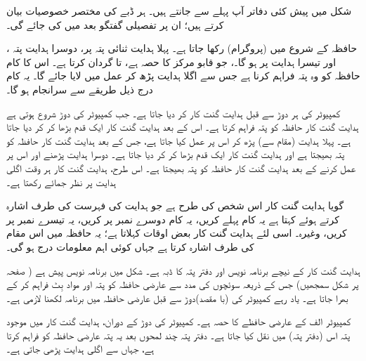 شکل  میں پیش کئی دفاتر  آپ پہلے سے  جانتے ہیں۔  ہر ڈبے کی مختصر  خصوصیات بیان کرتے ہیں؛ ان پر تفصیلی گفتگو بعد میں کی جائے گی۔

حافظہ  کے شروع میں (پروگرام)  رکھا جاتا ہے۔ پہلا ہدایت ثنائی پتہ  پر، دوسرا ہدایت پتہ ، اور تیسرا ہدایت  پر ہو گا۔،  جو قابو مرکز کا حصہ ہے،  تا  گردان کرتا ہے۔ اس کا کام حافظہ کو وہ پتہ فراہم کرنا ہے جس سے اگلا ہدایت پڑھ کر عمل میں لایا جائے گا۔ یہ کام درج ذیل طریقے سے سرانجام ہو گا۔

کمپیوٹر کی ہر دوڑ  سے قبل ہدایت گنت کار     کر دیا جاتا ہے۔ جب کمپیوٹر کی دوڑ شروع  ہوتی ہے ہدایت گنت کار   حافظہ کو پتہ  فراہم کرتا ہے۔ اس کے بعد ہدایت گنت کار   ایک قدم بڑھا کر   کر دیا جاتا ہے۔ پہلا ہدایت (مقام  سے) پڑھ کر اس پر عمل کیا جاتا ہے، جس کے بعد ہدایت گنت کار حافظہ کو پتہ  بھیجتا ہے اور   ہدایت گنت کار ایک قدم بڑھا کر  کر دیا جاتا ہے۔ دوسرا ہدایت پڑھنے اور اس پر عمل کرنے کے بعد ہدایت گنت کار حافظہ کو  پتہ بھیجتا ہے۔ اس طرح، ہدایت گنت کار ہر وقت اگلی  ہدایت  پر نظر جمائے رکھتا ہے۔

گویا ہدایت گنت کار اس شخص کی طرح ہے جو ہدایت کی فہرست  کی طرف اشارہ کرتے ہوئے کہتا ہے یہ کام  پہلے کریں، یہ کام دوسرے نمبر پر کریں، یہ تیسرے نمبر پر کریں، وغیرہ۔ اسی لئے ہدایت گنت کار بعض اوقات  کہلاتا ہے؛ یہ حافظہ میں اس مقام کی طرف اشارہ کرتا ہے جہاں کوئی   اہم معلومات درج ہو گی۔

ہدایت گنت کار کے نیچے برنامہ نویس   اور دفتر پتہ کا  ڈبہ ہے۔ شکل  میں برنامہ نویس پیش ہے (     صفحہ  پر شکل  سمجھیں)   جس  کے ذریعہ سوئچوں  کی مدد سے   عارضی حافظہ کو   پتہ اور  مواد   بِٹ فراہم کر  کے بھرا جاتا ہے۔ یاد رہے کمپیوٹر کی  (با مقصد)دوڑ سے قبل عارضی حافظہ میں برنامہ  لکھنا لازمی ہے۔

   کمپیوٹر  الف کے عارضی حافظے کا حصہ ہے۔ کمپیوٹر  کی دوڑ کے دوران، ہدایت گنت کار  میں موجود پتہ  اس   (دفتر پتہ)     میں  نقل  کیا جاتا ہے۔  دفتر پتہ   چند لمحوں بعد یہ پتہ عارضی  حافظہ کو فراہم کرتا ہے، جہاں سے   اگلی ہدایت پڑھی جاتی ہے۔

